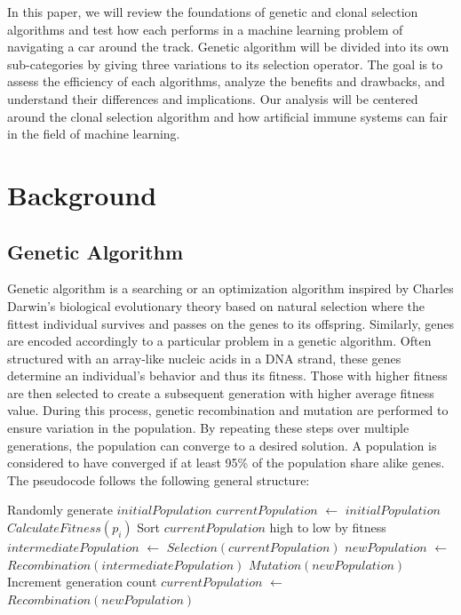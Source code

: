 \documentclass[]{interact}
\theoremstyle{plain} %
\theoremstyle{definition}
\theoremstyle{remark}
\begin{document}
In this paper, we will review the foundations of genetic and clonal selection algorithms and test how each performs in a machine learning problem of navigating a car around the track. Genetic algorithm will be divided into its own sub-categories by giving three variations to its selection operator. The goal is to assess the efficiency of each algorithms, analyze the benefits and drawbacks, and understand their differences and implications. Our analysis will be centered around the clonal selection algorithm and how artificial immune systems can fair in the field of machine learning.

\section{Background}

\subsection{Genetic Algorithm}
Genetic algorithm is a searching or an optimization algorithm inspired by Charles Darwin's biological evolutionary theory based on natural selection where the fittest individual survives and passes on the genes to its offspring. Similarly, genes are encoded accordingly to a particular problem in a genetic algorithm. Often structured with an array-like nucleic acids in a DNA strand, these genes determine an individual's behavior and thus its fitness. Those with higher fitness are then selected to create a subsequent generation with higher average fitness value. During this process, genetic recombination and mutation are performed to ensure variation in the population. By repeating these steps over multiple generations, the population can converge to a desired solution. A population is considered to have converged if at least 95\% of the population share alike genes. The pseudocode follows the following general structure:

\hfill
\begin{algorithmic}[1]
	\State Randomly generate $initialPopulation$
    \State $currentPopulation$ $\leftarrow$ $initialPopulation$	    
            \State $CalculateFitness(p_{i})$
        \EndFor
        \State Sort $currentPopulation$ high to low by fitness
        \State $intermediatePopulation$ $\leftarrow$ $Selection(currentPopulation)$
        \State $newPopulation$ $\leftarrow$ $Recombination(intermediatePopulation)$
	    \State $Mutation(newPopulation)$
	    \State Increment generation count
	    \State $currentPopulation$ $\leftarrow$ $Recombination(newPopulation)$
	\EndWhile
	\EndFunction
\end{algorithmic}
\end{document}
